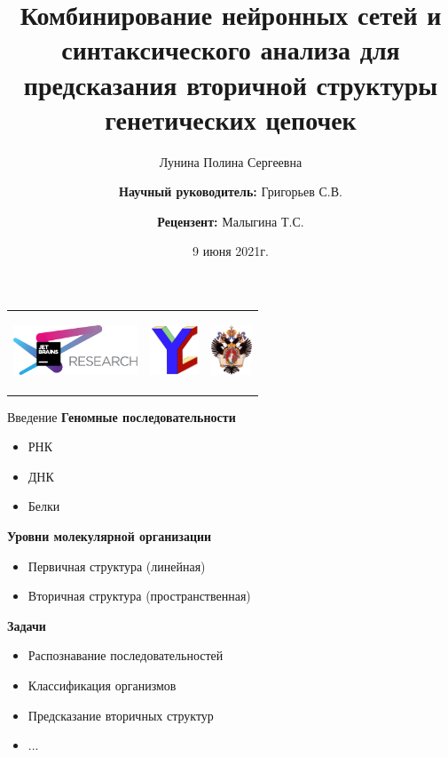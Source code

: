 \documentclass{beamer}
\title[]{Комбинирование нейронных сетей и синтаксического анализа для предсказания вторичной структуры генетических цепочек}
\institute[СПбГУ]{
Санкт-Петербургский государственный университет}
\author[Лунина Полина]{Лунина Полина Сергеевна \\
  \and  
    {\bfseries Научный руководитель:} Григорьев С.В. \\
	\and
	{\bfseries Рецензент:} Малыгина Т.С.}
\date{9 июня 2021г.}
\begin{document}
{
\begin{frame}[fragile]
  \begin{tabular}{p{2.0cm} p{7.5cm} p{1cm}}
   \begin{center}
      \includegraphics[height=1.5cm]{pics/jetbrainsResearch.pdf}
    \end{center}
    &
    \begin{center}
      \includegraphics[height=1.5cm]{pics/YC_logo.pdf}
    \end{center}
    &
    \begin{center}
      \includegraphics[height=1.5cm]{pics/SPbGU_Logo.png}
    \end{center}
  \end{tabular}
  \titlepage
\end{frame}
}

\begin{frame}{Введение}
\textbf{Геномные последовательности}
\begin{itemize}
    \item РНК
    \item ДНК
    \item Белки
\end{itemize}

\vspace{3mm} 

\textbf{Уровни молекулярной организации}
\begin{itemize}
    \item Первичная структура (линейная)
    \item Вторичная структура (пространственная)
\end{itemize}

\vspace{3mm} 

\textbf{Задачи}
\begin{itemize}
    \item Распознавание последовательностей
    \item Классификация организмов
    \item Предсказание вторичных структур
    \item ...
\end{itemize}
\end{frame}
\end{document}

